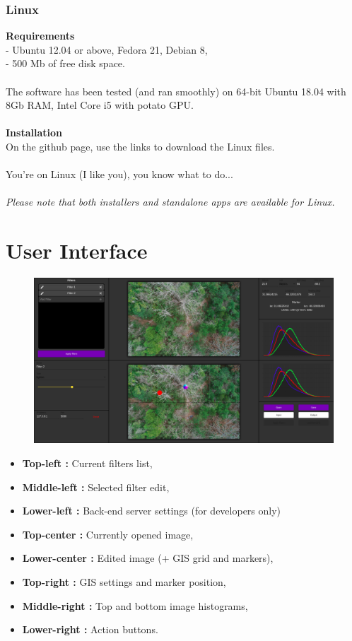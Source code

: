 \documentclass[12pt,a4paper]{article}
\begin{document}
\section{Linux}
\textbf{Requirements}\\
- Ubuntu 12.04 or above, Fedora 21, Debian 8,\\
- 500 Mb of free disk space.\\
~\\
The software has been tested (and ran smoothly) on 64-bit Ubuntu 18.04 with 8Gb RAM, Intel Core i5 with potato GPU.\\
~\\
\textbf{Installation}\\
On the github page, use the links to download the Linux files.\\
~\\
You're on Linux (I like you), you know what to do...\\
~\\
\textit{Please note that both installers and standalone apps are available for Linux.}

\pagebreak

\part{User Interface}
\setcounter{section}{0}

\begin{figure}[H]
	\includegraphics[scale=0.25]{user_interface}
	\centering
\end{figure}

\begin{itemize}
	\item \textbf{Top-left :} Current filters list,
	\item \textbf{Middle-left :} Selected filter edit,
	\item \textbf{Lower-left :} Back-end server settings (for developers only)
	\item \textbf{Top-center :} Currently opened image,
	\item \textbf{Lower-center :} Edited image (+ GIS grid and markers),
	\item \textbf{Top-right :} GIS settings and marker position,
	\item \textbf{Middle-right :} Top and bottom image histograms,
	\item \textbf{Lower-right :} Action buttons.
\end{itemize}
\end{document}
